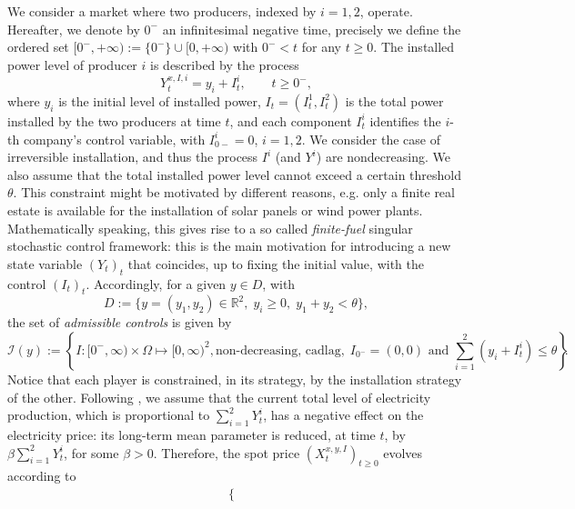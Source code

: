 \documentclass[10pt]{article}
\numberwithin{equation}{section}
\theoremstyle{plain}
\numberwithin{theorem}{section}
\theoremstyle{definition}
\def \R {\mathbb{R}}
\newcommand{\<}{\langle}
\renewcommand{\>}{\rangle}
\renewcommand{\(}{\left(}
\renewcommand{\)}{\right)}
\def \R  {{\mathbb {R}}}
\def \R {{\mathbb {R}}}
\def\cI{{\mathcal I}}
\begin{document}
{We consider a market where two producers, indexed by $i=1,2$, operate. {Hereafter, we denote by $0^{-}$ an infinitesimal negative time, precisely we define the ordered set $[0^{-},+\infty):=\{0^-\} \cup [0,+\infty)$ with $0^{-}<t $ for any $t\geq 0$.}
The installed power level of producer $i$ is described by the process 
\begin{equation}\label{installed_power}
Y^{x,I,i}_t=y_i+I^i_t, \qquad t\ge 0^-,
\end{equation}
where $y_i$ is the initial level of installed power, $I_t=(I_t^1,I_t^2)$ is the total power installed by the two producers {at time $t$}, %
and each component $I^i_t$ identifies the $i$-th company's control variable, with $I^i_{0-} = 0$, $i = 1,2$. {We consider the case of irreversible installation, and thus the process $I^i$ (and $Y^i$) are nondecreasing.} We also assume that the total installed power level cannot exceed a certain threshold $\theta$. {This constraint might be motivated by different reasons, e.g. only a finite real estate is available for the installation of solar panels or wind power plants. Mathematically speaking, this gives rise to a so called \emph{finite-fuel} singular stochastic control framework: this is the main motivation for introducing a new state variable $(Y_t)_t$ that coincides, up to fixing the initial value, with the control $(I_t)_t$.}  Accordingly, {for a given $y\in D$, with  
\begin{equation}
D:=\{y=(y_1,y_2)\in\R^2, \; y_i\ge 0, \; y_1+y_2<\theta\},
\end{equation}}
the set of \textit{admissible controls} is given by 
\begin{equation}\label{eq:def_strat_ammiss}
\cI (y) := \left\{ I:{[0^-,\infty)}\times \Omega \mapsto [0,\infty)^2, \text{non-decreasing, cadlag}, %
\; {I_{0^-} = (0,0)\text{ and }}\sum_{i=1}^2(y_i+I^i_t)\le \theta \right\}.
\end{equation}
Notice that each player is constrained, in its strategy, by the installation strategy of the other.
Following  \cite{MR4305783}, we assume that the current total level of electricity production, which is proportional to $\sum_{i=1}^2Y^i_t$, has a negative effect on the electricity price: {its long-term mean parameter is reduced, at time $t$, by $\beta \sum_{i=1}^2Y^i_t$}, for some $\beta>0$.
Therefore, the spot price $(X^{x,y,I}_t)_{t\ge 0}$ evolves according to 
\begin{align}\label{model}
\begin{cases}

\end{cases}
\end{align}}
\end{document}

